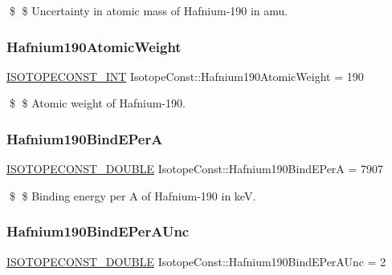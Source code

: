 \$ \$ Uncertainty in atomic mass of Hafnium-\/190 in amu. \mbox{\label{group___isotope_const-_hafnium-_hf190_ga76d79fe39134830cec64a6c9545d8585}} 
\subsubsection{\texorpdfstring{Hafnium190\+Atomic\+Weight}{Hafnium190AtomicWeight}}
{\footnotesize\ttfamily \mbox{\hyperlink{group___isotope_const-_macros_ga5f18360b3e99483a35c32d789e62621c}{I\+S\+O\+T\+O\+P\+E\+C\+O\+N\+S\+T\+\_\+\+I\+NT}} Isotope\+Const\+::\+Hafnium190\+Atomic\+Weight = 190}

\$ \$ Atomic weight of Hafnium-\/190. \mbox{\label{group___isotope_const-_hafnium-_hf190_gac3622d8f2f23adc5de850f6047ea622a}} 
\subsubsection{\texorpdfstring{Hafnium190\+Bind\+E\+PerA}{Hafnium190BindEPerA}}
{\footnotesize\ttfamily \mbox{\hyperlink{group___isotope_const-_macros_ga8f45a7272ce02c0b4c65c44636ed719a}{I\+S\+O\+T\+O\+P\+E\+C\+O\+N\+S\+T\+\_\+\+D\+O\+U\+B\+LE}} Isotope\+Const\+::\+Hafnium190\+Bind\+E\+PerA = 7907}

\$ \$ Binding energy per A of Hafnium-\/190 in keV. \mbox{\label{group___isotope_const-_hafnium-_hf190_ga937ca7b67e3bef2390268b49b4f6c940}} 
\subsubsection{\texorpdfstring{Hafnium190\+Bind\+E\+Per\+A\+Unc}{Hafnium190BindEPerAUnc}}
{\footnotesize\ttfamily \mbox{\hyperlink{group___isotope_const-_macros_ga8f45a7272ce02c0b4c65c44636ed719a}{I\+S\+O\+T\+O\+P\+E\+C\+O\+N\+S\+T\+\_\+\+D\+O\+U\+B\+LE}} Isotope\+Const\+::\+Hafnium190\+Bind\+E\+Per\+A\+Unc = 2}

